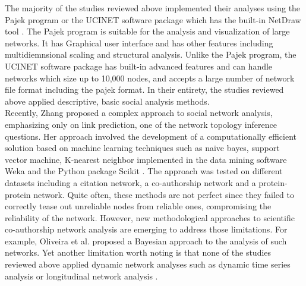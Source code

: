 The majority of the studies reviewed above implemented their analyses using the Pajek program \citep{BatageljPajek2014} or the UCINET software package which has the built-in NetDraw tool \citep{BorgattiUCINET2014}. The Pajek program is suitable for the analysis and visualization of large networks. It has Graphical user interface and has other features including multidiemnsional scaling and structural analysis. Unlike the Pajek program, the UCINET software package has built-in advanced features and can handle networks which size up to 10,000 nodes, and accepts a large number of network file format including the pajek format. In their entirety, the studies reviewed above applied descriptive, basic social analysis methods.\\
Recently, Zhang \cite{zhang_complex_2014} proposed a complex approach to social network analysis, emphasizing only on link prediction, one of the network topology inference questions. Her approach involved the development of a computationally efficient solution based on machine learning techniques such as naive bayes, support vector machine, K-nearest neighbor implemented in the data mining software Weka \citep{HallWEKAdatamining2009} and the Python package Scikit \citep{PedregosaScikitlearnMachinelearning2011}. The approach was tested on different datasets including a citation network, a co-authorship network and a protein-protein network. Quite often, these methods are not perfect since they failed to correctly tease out unreliable nodes from reliable ones, compromising the reliability of the network. However, new methodological approaches to scientific co-authorship network analysis are emerging to address those limitations. For example, Oliveira et al. \cite{oliveira_bayesian_2017} proposed a Bayesian approach to the analysis of such networks. Yet another limitation worth noting is that none of the studies reviewed above applied dynamic network analyses such as dynamic time series analysis or longitudinal network analysis \cite{mali_dynamic_2012}.%

